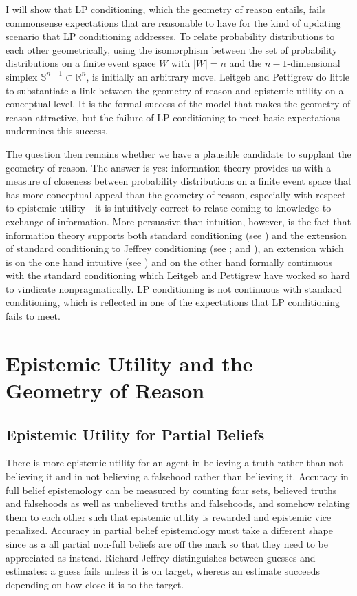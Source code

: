 \documentclass[11pt]{article}
\begin{document}
I will show that LP conditioning, which the geometry of reason
entails, fails commonsense expectations that are reasonable to have
for the kind of updating scenario that LP conditioning addresses. To
relate probability distributions to each other geometrically, using
the isomorphism between the set of probability distributions on a
finite event space $W$ with $|W|=n$ and the $n-1$-dimensional simplex
$\mathbb{S}^{n-1}\subset\mathbb{R}^{n}$, is initially an arbitrary
move. Leitgeb and Pettigrew do little to substantiate a link between
the geometry of reason and epistemic utility on a conceptual level. It
is the formal success of the model that makes the geometry of reason
attractive, but the failure of LP conditioning to meet basic
expectations undermines this success.

The question then remains whether we have a plausible candidate to
supplant the geometry of reason. The answer is yes: information theory
provides us with a measure of closeness between probability
distributions on a finite event space that has more conceptual appeal
than the geometry of reason, especially with respect to epistemic
utility---it is intuitively correct to relate coming-to-knowledge to
exchange of information. More persuasive than intuition, however, is
the fact that information theory supports both standard conditioning
(see ) and the extension of standard
conditioning to Jeffrey conditioning (see
; and ), an extension
which is on the one hand intuitive (see )
and on the other hand formally continuous with the standard
conditioning which Leitgeb and Pettigrew have worked so hard to
vindicate nonpragmatically. LP conditioning is not continuous with
standard conditioning, which is reflected in one of the expectations
that LP conditioning fails to meet. 

\section{Epistemic Utility and the Geometry of Reason}
\label{eugr}

\subsection{Epistemic Utility for Partial Beliefs}
\label{subsec:oochihei}

There is more epistemic utility for an agent in believing a truth
rather than not believing it and in not believing a falsehood rather
than believing it. Accuracy in full belief epistemology can be
measured by counting four sets, believed truths and falsehoods as well
as unbelieved truths and falsehoods, and somehow relating them to each
other such that epistemic utility is rewarded and epistemic vice
penalized. Accuracy in partial belief epistemology must take a
different shape since as a  all partial non-full beliefs
are off the mark so that they need to be appreciated as
 instead. Richard Jeffrey distinguishes between
guesses and estimates: a guess fails unless it is on target, whereas
an estimate succeeds depending on how close it is to the target.
\end{document}

